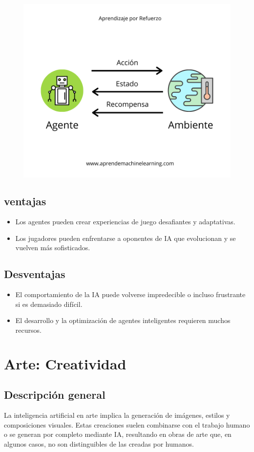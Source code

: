 \documentclass[12pt]{article}
\begin{document}
\begin{figure}[h!]
    \centering
    \includegraphics[width=.5\textwidth]{AprendizajeRefuerzo-global.png}
    \label{fig:my_label}
\end{figure}

\clearpage

\subsection{ventajas}
\begin{itemize}
    \item Los agentes pueden crear experiencias de juego desafiantes y adaptativas.
    \item Los jugadores pueden enfrentarse a oponentes de IA que evolucionan y se vuelven más sofisticados.
\end{itemize}

\subsection{Desventajas}
\begin{itemize}
    \item El comportamiento de la IA puede volverse impredecible o incluso frustrante si es demasiado difícil.
    \item El desarrollo y la optimización de agentes inteligentes requieren muchos recursos.
\end{itemize}

\section{Arte: Creatividad}
\subsection{Descripción general}

La inteligencia artificial en arte implica la generación de imágenes, estilos y composiciones visuales. Estas creaciones suelen 
combinarse con el trabajo humano o se generan por completo mediante IA, resultando en obras de arte que, en algunos casos, no son 
distinguibles de las creadas por humanos.
\end{document}
